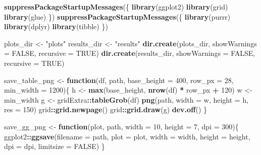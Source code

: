 \documentclass[
]{article}
\newenvironment{Shaded}{\begin{snugshade}}{\end{snugshade}}
\newcommand{\AttributeTok}[1]{\textcolor[rgb]{0.13,0.29,0.53}{#1}}
\newcommand{\ConstantTok}[1]{\textcolor[rgb]{0.56,0.35,0.01}{#1}}
\newcommand{\ControlFlowTok}[1]{\textcolor[rgb]{0.13,0.29,0.53}{\textbf{#1}}}
\newcommand{\DecValTok}[1]{\textcolor[rgb]{0.00,0.00,0.81}{#1}}
\newcommand{\FunctionTok}[1]{\textcolor[rgb]{0.13,0.29,0.53}{\textbf{#1}}}
\newcommand{\NormalTok}[1]{#1}
\newcommand{\OtherTok}[1]{\textcolor[rgb]{0.56,0.35,0.01}{#1}}
\newcommand{\SpecialCharTok}[1]{\textcolor[rgb]{0.81,0.36,0.00}{\textbf{#1}}}
\newcommand{\StringTok}[1]{\textcolor[rgb]{0.31,0.60,0.02}{#1}}
\begin{document}
\begin{Shaded}
\begin{Highlighting}[]
\FunctionTok{suppressPackageStartupMessages}\NormalTok{(\{}
  \FunctionTok{library}\NormalTok{(ggplot2)}
  \FunctionTok{library}\NormalTok{(grid)}
  \FunctionTok{library}\NormalTok{(glue)}
\NormalTok{\})}
\FunctionTok{suppressPackageStartupMessages}\NormalTok{(\{}
  \FunctionTok{library}\NormalTok{(purrr)}
  \FunctionTok{library}\NormalTok{(dplyr)}
  \FunctionTok{library}\NormalTok{(tibble)}
\NormalTok{\})}

\NormalTok{plots\_dir }\OtherTok{\textless{}{-}} \StringTok{"plots"}
\NormalTok{results\_dir }\OtherTok{\textless{}{-}} \StringTok{"results"}
\FunctionTok{dir.create}\NormalTok{(plots\_dir, }\AttributeTok{showWarnings =} \ConstantTok{FALSE}\NormalTok{, }\AttributeTok{recursive =} \ConstantTok{TRUE}\NormalTok{)}
\FunctionTok{dir.create}\NormalTok{(results\_dir, }\AttributeTok{showWarnings =} \ConstantTok{FALSE}\NormalTok{, }\AttributeTok{recursive =} \ConstantTok{TRUE}\NormalTok{)}

\NormalTok{save\_table\_png }\OtherTok{\textless{}{-}} \ControlFlowTok{function}\NormalTok{(df, path, }\AttributeTok{base\_height =} \DecValTok{400}\NormalTok{, }\AttributeTok{row\_px =} \DecValTok{28}\NormalTok{, }\AttributeTok{min\_width =} \DecValTok{1200}\NormalTok{)\{}
\NormalTok{  h }\OtherTok{\textless{}{-}} \FunctionTok{max}\NormalTok{(base\_height, }\FunctionTok{nrow}\NormalTok{(df) }\SpecialCharTok{*}\NormalTok{ row\_px }\SpecialCharTok{+} \DecValTok{120}\NormalTok{)}
\NormalTok{  w }\OtherTok{\textless{}{-}}\NormalTok{ min\_width}
\NormalTok{  g }\OtherTok{\textless{}{-}}\NormalTok{ gridExtra}\SpecialCharTok{::}\FunctionTok{tableGrob}\NormalTok{(df)}
  \FunctionTok{png}\NormalTok{(path, }\AttributeTok{width =}\NormalTok{ w, }\AttributeTok{height =}\NormalTok{ h, }\AttributeTok{res =} \DecValTok{150}\NormalTok{)}
\NormalTok{  grid}\SpecialCharTok{::}\FunctionTok{grid.newpage}\NormalTok{()}
\NormalTok{  grid}\SpecialCharTok{::}\FunctionTok{grid.draw}\NormalTok{(g)}
  \FunctionTok{dev.off}\NormalTok{()}
\NormalTok{\}}

\NormalTok{save\_gg\_png }\OtherTok{\textless{}{-}} \ControlFlowTok{function}\NormalTok{(plot, path, }\AttributeTok{width =} \DecValTok{10}\NormalTok{, }\AttributeTok{height =} \DecValTok{7}\NormalTok{, }\AttributeTok{dpi =} \DecValTok{300}\NormalTok{)\{}
\NormalTok{  ggplot2}\SpecialCharTok{::}\FunctionTok{ggsave}\NormalTok{(}\AttributeTok{filename =}\NormalTok{ path, }\AttributeTok{plot =}\NormalTok{ plot, }\AttributeTok{width =}\NormalTok{ width, }\AttributeTok{height =}\NormalTok{ height, }\AttributeTok{dpi =}\NormalTok{ dpi, }\AttributeTok{limitsize =} \ConstantTok{FALSE}\NormalTok{)}
\NormalTok{\}}
\end{Highlighting}
\end{Shaded}
\end{document}
